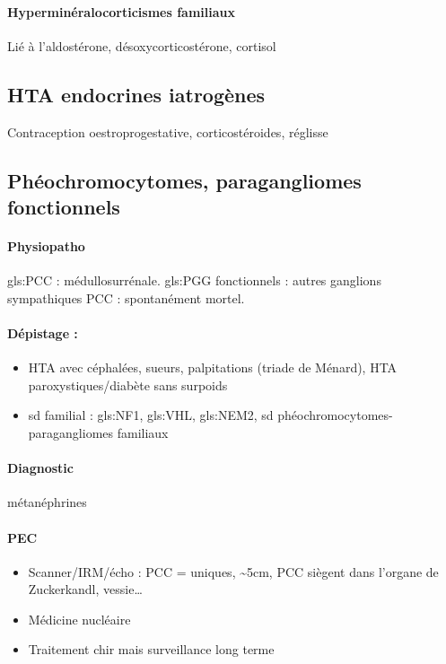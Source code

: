 \documentclass{book}
\begin{document}
\paragraph{Hyperminéralocorticismes familiaux}
\label{sec:orgf1ca722}
Lié à l'aldostérone, désoxycorticostérone, cortisol

\subsection{HTA endocrines iatrogènes}
\label{sec:org3d12f65}
Contraception oestroprogestative, corticostéroides, réglisse

\subsection{Phéochromocytomes, paragangliomes fonctionnels}
\label{sec:org1cc0760}
\paragraph{Physiopatho}
\label{sec:org750f327}
gls:PCC : médullosurrénale. gls:PGG fonctionnels : autres    ganglions sympathiques
 \faBomb{} PCC : spontanément mortel. 

\paragraph{Dépistage :}
\label{sec:orgf203729}
\begin{itemize}
\item HTA avec céphalées, sueurs, palpitations (triade de Ménard), HTA paroxystiques/diabète sans
surpoids
\item sd familial : gls:NF1, gls:VHL, gls:NEM2, sd phéochromocytomes-paragangliomes familiaux
\end{itemize}

\paragraph{Diagnostic}
\label{sec:org025bbc2}
\inc métanéphrines

\paragraph{PEC}
\label{sec:org0b49779}
\begin{itemize}
\item Scanner/IRM/écho : PCC = uniques, \textasciitilde{}5cm, PCC siègent dans l'organe de Zuckerkandl, vessie\ldots{}
\item Médicine nucléaire
\item Traitement chir mais surveillance long terme
\end{itemize}
\end{document}

